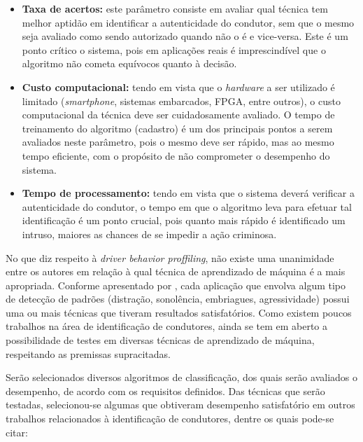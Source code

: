 \begin{itemize}

    \item \textbf{Taxa de acertos:} este parâmetro consiste em avaliar qual técnica tem melhor aptidão em identificar a autenticidade do condutor, sem que o mesmo seja avaliado como sendo autorizado quando não o é e vice-versa. Este é um ponto crítico o sistema, pois em aplicações reais é imprescindível que o algoritmo não cometa equívocos quanto à decisão.
    
    \item \textbf{Custo computacional:} tendo em vista que o \textit{hardware} a ser utilizado é limitado (\textit{smartphone}, sistemas embarcados, FPGA, entre outros), o custo computacional da técnica deve ser cuidadosamente avaliado. O tempo de treinamento do algoritmo (cadastro) é um dos principais pontos a serem avaliados neste parâmetro, pois o mesmo deve ser rápido, mas ao mesmo tempo eficiente, com o propósito de não comprometer o desempenho do sistema.
    
    \item \textbf{Tempo de processamento:} tendo em vista que o sistema deverá verificar a autenticidade do condutor, o tempo em que o algoritmo leva para efetuar tal identificação é um ponto crucial, pois quanto mais rápido é identificado um intruso, maiores as chances de se impedir a ação criminosa.
    
\end{itemize}

No que diz respeito à \textit{driver behavior proffiling}, não existe uma unanimidade entre os autores em relação à qual técnica de aprendizado de máquina é a mais apropriada. Conforme apresentado por , cada aplicação que envolva algum tipo de detecção de padrões (distração, sonolência, embriagues, agressividade) possui uma ou mais técnicas que tiveram resultados satisfatórios. Como existem poucos trabalhos na área de identificação de condutores, ainda se tem em aberto a possibilidade de testes em diversas técnicas de aprendizado de máquina, respeitando as premissas supracitadas.

Serão selecionados diversos algoritmos de classificação, dos quais serão avaliados o desempenho, de acordo com os requisitos definidos. Das técnicas que serão testadas, selecionou-se algumas que obtiveram desempenho satisfatório em outros trabalhos relacionados à identificação de condutores, dentre os quais pode-se citar:

